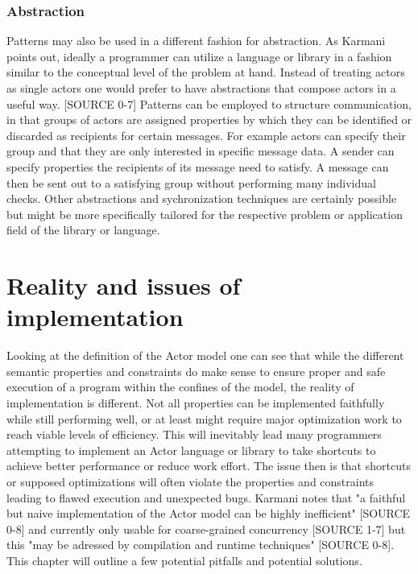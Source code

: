 \documentclass[A4]{article}
\begin{document}
\subsubsection{Abstraction}
Patterns may also be used in a different fashion for abstraction. As Karmani points out, ideally a programmer can utilize a language or library in a fashion similar to the conceptual level of the problem at hand. Instead of treating actors as single actors one would prefer to have abstractions that compose actors in a useful way. [SOURCE 0-7]
Patterns can be employed to structure communication, in that groups of actors are assigned properties by which they can be identified or discarded as recipients for certain messages. For example actors can specify their group and that they are only interested in specific message data. A sender can specify properties the recipients of its message need to satisfy. A message can then be sent out to a satisfying group without performing many individual checks. 
Other abstractions and sychronization techniques are certainly possible but might be more specifically tailored for the respective problem or application field of the library or language.

\section{Reality and issues of implementation}
Looking at the definition of the Actor model one can see that while the different semantic properties and constraints do make sense to ensure proper and safe execution of a program within the confines of the model, the reality of implementation is different. Not all properties can be implemented faithfully while still performing well, or at least might require major optimization work to reach viable levels of efficiency. This will inevitably lead many programmers attempting to implement an Actor language or library to take shortcuts to achieve better performance or reduce work effort. The issue then is that shortcuts or supposed optimizations will often violate the properties and constraints leading to flawed execution and unexpected bugs. Karmani notes that "a faithful but naive implementation of the Actor model can be highly inefficient" [SOURCE 0-8] and currently only usable for coarse-grained concurrency [SOURCE 1-7] but this "may be adressed by compilation and runtime techniques" [SOURCE 0-8]. This chapter will outline a few potential pitfalls and potential solutions.
\end{document}
